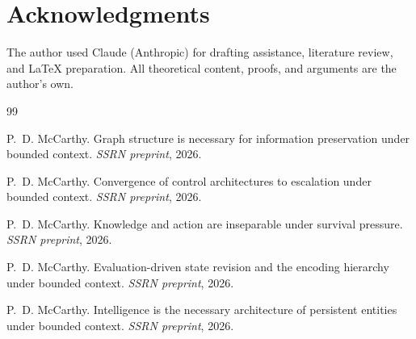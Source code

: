 \documentclass[11pt]{article}
\theoremstyle{definition}
\begin{document}
\section*{Acknowledgments}

The author used Claude (Anthropic) for drafting assistance, literature
review, and \LaTeX{} preparation. All theoretical content, proofs, and
arguments are the author's own.


\begin{thebibliography}{99}

P.~D. McCarthy.
\newblock Graph structure is necessary for information preservation
under bounded context.
\newblock \emph{SSRN preprint}, 2026.

P.~D. McCarthy.
\newblock Convergence of control architectures to escalation under bounded context.
\newblock \emph{SSRN preprint}, 2026.

P.~D. McCarthy.
\newblock Knowledge and action are inseparable under survival pressure.
\newblock \emph{SSRN preprint}, 2026.

P.~D. McCarthy.
\newblock Evaluation-driven state revision and the encoding hierarchy
  under bounded context.
\newblock \emph{SSRN preprint}, 2026.

P.~D. McCarthy.
\newblock Intelligence is the necessary architecture of persistent
entities under bounded context.
\newblock \emph{SSRN preprint}, 2026.

\end{thebibliography}
\end{document}
